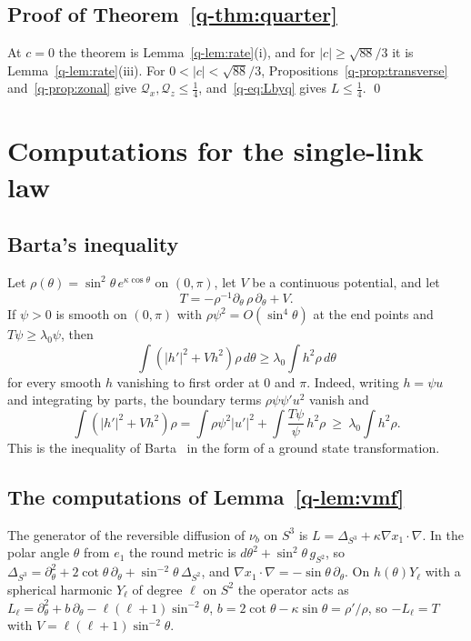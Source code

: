 \subsection{Proof of Theorem~\ref{q-thm:quarter}}

At $c=0$ the theorem is Lemma~\ref{q-lem:rate}(i), and for $|c|\ge\sqrt{88}/3$
it is Lemma~\ref{q-lem:rate}(iii). For $0<|c|<\sqrt{88}/3$,
Propositions~\ref{q-prop:transverse} and~\ref{q-prop:zonal} give $\mathcal Q_x,
\mathcal Q_z\le\frac14$, and~\eqref{q-eq:Lbyq} gives $L\le\frac14$. \qed


\section{Computations for the single-link law}\label{app:vmfcomp}

\subsection{Barta's inequality}

Let $\rho(\theta)=\sin^2\theta\,e^{\kappa\cos\theta}$ on $(0,\pi)$, let $V$
be a continuous potential, and let
\[
T=-\rho^{-1}\partial_\theta\,\rho\,\partial_\theta+V .
\] If $\psi>0$ is smooth on $(0,\pi)$ with
$\rho\psi^2=O(\sin^4\theta)$ at the end points and $T\psi\ge\lambda_0\psi$,
then
\[
\int(|h'|^2+Vh^2)\rho\,d\theta\ge\lambda_0\int h^2\rho\,d\theta
\]
for every smooth $h$ vanishing to first order at $0$ and $\pi$. Indeed, writing
$h=\psi u$ and integrating by parts, the boundary terms $\rho\psi\psi'u^2$
vanish and
\[
\int(|h'|^2+Vh^2)\rho=\int\rho\psi^2|u'|^2+\int\frac{T\psi}\psi\,h^2\rho
\ \ge\ \lambda_0\int h^2\rho .
\]
This is the inequality of Barta~\cite{Bar37} in the form of a ground state
transformation.

\subsection{The computations of Lemma~\ref{q-lem:vmf}}

The generator of the reversible diffusion of $\nu_b$ on $S^3$ is
$L=\Delta_{S^3}+\kappa\nabla x_1\cdot\nabla$. In the polar angle $\theta$
from $e_1$ the round metric is $d\theta^2+\sin^2\theta\,g_{S^2}$, so
$\Delta_{S^3}=\partial_\theta^2+2\cot\theta\,\partial_\theta+\sin^{-2}\theta\,
\Delta_{S^2}$, and $\nabla x_1\cdot\nabla=-\sin\theta\,\partial_\theta$. On
$h(\theta)Y_\ell$ with a spherical harmonic $Y_\ell$ of degree $\ell$ on $S^2$
the operator acts as $L_\ell=\partial_\theta^2+b\,\partial_\theta-\ell(\ell+1)
\sin^{-2}\theta$, $b=2\cot\theta-\kappa\sin\theta=\rho'/\rho$, so
$-L_\ell=T$ with $V=\ell(\ell+1)\sin^{-2}\theta$.

